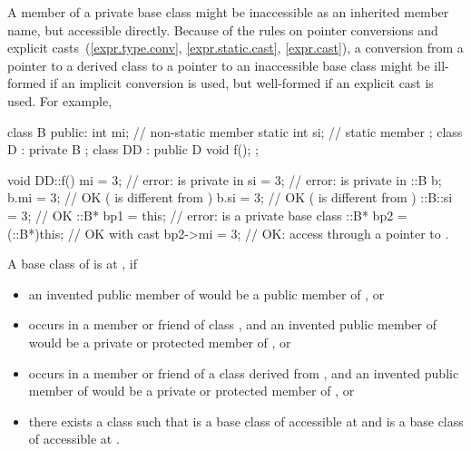 \pnum
\begin{note}
A member of a private base class might be inaccessible as an inherited
member name, but accessible directly.
Because of the rules on pointer conversions and
explicit casts~(\ref{expr.type.conv}, \ref{expr.static.cast}, \ref{expr.cast}),
a conversion from a pointer to a derived class to a pointer
to an inaccessible base class might be ill-formed if an implicit conversion
is used, but well-formed if an explicit cast is used.
For example,

\begin{codeblock}
class B {
public:
  int mi;                       // non-static member
  static int si;                // static member
};
class D : private B {
};
class DD : public D {
  void f();
};

void DD::f() {
  mi = 3;                       // error:  is private in 
  si = 3;                       // error:  is private in 
  ::B  b;
  b.mi = 3;                     // OK ( is different from )
  b.si = 3;                     // OK ( is different from )
  ::B::si = 3;                  // OK
  ::B* bp1 = this;              // error:  is a private base class
  ::B* bp2 = (::B*)this;        // OK with cast
  bp2->mi = 3;                  // OK: access through a pointer to .
}
\end{codeblock}
\end{note}

\pnum
A base class
of
is
at
,
if
\begin{itemize}
\item
an invented public member of
would be a public member of
, or
\item
{}
occurs in a member or friend of class
,
and an invented public member of
would be a private or protected member of
, or
\item
{}
occurs in a member or friend of a class
derived from
,
and an invented public member of
would be a private or protected member of
, or
\item
there exists a class
such that
is a base class of
accessible at
and
is a base class of
accessible at
.
\end{itemize}

